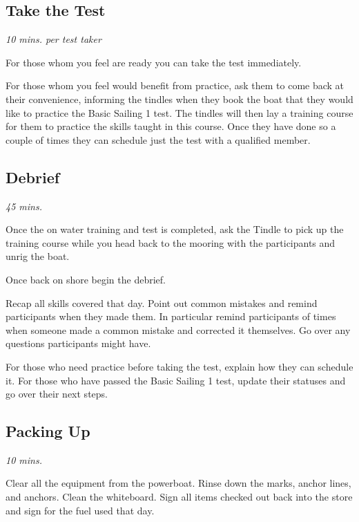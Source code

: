 \documentclass[12pt]{scrartcl}
\begin{document}
\subsection{Take the Test} \label{subsec:take the test}

{\small \textit{10 mins. per test taker}}

For those whom you feel are ready you can take the test immediately.

For those whom you feel would benefit from practice, ask them to come back at their convenience, informing the tindles when they book the boat that they would like to practice the Basic Sailing 1 test. The tindles will then lay a training course for them to practice the skills taught in this course. Once they have done so a couple of times they can schedule just the test with a qualified member.

\newpage

\subsection{Debrief} \label{subsec: Debrief}

{\small \textit{45 mins.}}

Once the on water training and test is completed, ask the Tindle to pick up the training course while you head back to the mooring with the participants and unrig the boat.

Once back on shore begin the debrief.

Recap all skills covered that day. Point out common mistakes and remind participants when they made them. In particular remind participants of times when someone made a common mistake and corrected it themselves. Go over any questions participants might have.

For those who need practice before taking the test, explain how they can schedule it. For those who have passed the Basic Sailing 1 test, update their statuses and go over their next steps.

\subsection{Packing Up} \label{subsec:packing up}

{\small \textit{10 mins.}}

Clear all the equipment from the powerboat. Rinse down the marks, anchor lines, and anchors. Clean the whiteboard. Sign all items checked out back into the store and sign for the fuel used that day.
\end{document}
